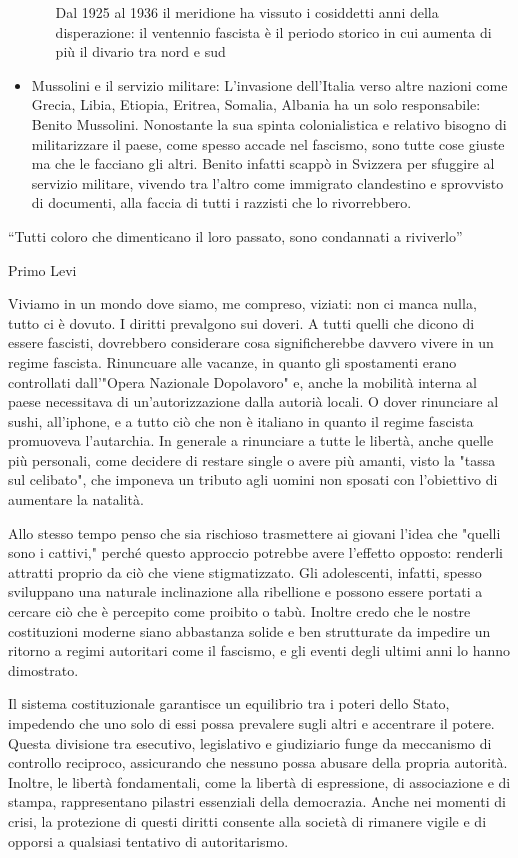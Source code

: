 \documentclass[12pt]{book} %
\begin{document}
\begin{mdframed}[linewidth=1pt]
\begin{itemize}
\begin{itemize}
Dal 1925 al 1936 il meridione ha vissuto i cosiddetti {\textquotedbl}anni della disperazione{\textquotedbl}: il
ventennio fascista è il periodo storico in cui aumenta di più il divario tra nord e sud
\end{itemize}
\item Mussolini e il servizio militare: L'invasione dell'Italia verso altre
nazioni come Grecia, Libia, Etiopia, Eritrea, Somalia, Albania ha un solo responsabile: Benito Mussolini. Nonostante la
sua spinta colonialistica e relativo bisogno di militarizzare il paese, come spesso accade nel fascismo, sono tutte
cose giuste ma che le facciano gli altri. Benito infatti scappò in Svizzera per sfuggire al servizio militare, vivendo
tra l'altro come immigrato clandestino e sprovvisto di documenti, alla faccia di tutti i razzisti
che lo rivorrebbero.
\end{itemize}
“Tutti coloro che dimenticano il loro passato, sono condannati a riviverlo”

Primo Levi

Viviamo in un mondo dove siamo, me compreso, viziati: non ci manca nulla, tutto ci è dovuto. I diritti prevalgono sui doveri. A tutti quelli che dicono di essere fascisti, dovrebbero considerare cosa significherebbe davvero vivere in un regime fascista. Rinuncuare alle vacanze, in quanto gli spostamenti erano controllati dall'"Opera Nazionale Dopolavoro" e, anche la mobilità interna al paese necessitava di un'autorizzazione dalla autorià locali. O dover rinunciare al sushi, all'iphone, e a tutto ciò che non è italiano in quanto il regime fascista promuoveva l'autarchia. In generale a rinunciare a tutte le libertà, anche quelle più personali, come decidere di restare single o avere più amanti, visto la "tassa sul celibato", che imponeva un tributo agli uomini non sposati con l'obiettivo di aumentare la natalità.

Allo stesso tempo penso che sia rischioso trasmettere ai giovani l'idea che "quelli sono i cattivi," perché questo approccio potrebbe avere l’effetto opposto: renderli attratti proprio da ciò che viene stigmatizzato. Gli adolescenti, infatti, spesso sviluppano una naturale inclinazione alla ribellione e possono essere portati a cercare ciò che è percepito come proibito o tabù. Inoltre credo che le nostre costituzioni moderne siano abbastanza solide e ben strutturate da impedire un ritorno a regimi autoritari come il fascismo, e gli eventi degli ultimi anni lo hanno dimostrato.

Il sistema costituzionale garantisce un equilibrio tra i poteri dello Stato, impedendo che uno solo di essi possa prevalere sugli altri e accentrare il potere. Questa divisione tra esecutivo, legislativo e giudiziario funge da meccanismo di controllo reciproco, assicurando che nessuno possa abusare della propria autorità. Inoltre, le libertà fondamentali, come la libertà di espressione, di associazione e di stampa, rappresentano pilastri essenziali della democrazia. Anche nei momenti di crisi, la protezione di questi diritti consente alla società di rimanere vigile e di opporsi a qualsiasi tentativo di autoritarismo.


\end{mdframed}
\end{document}
